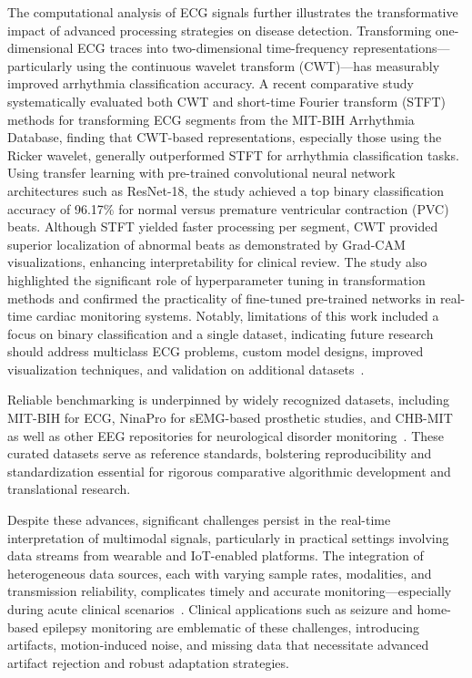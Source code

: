 \documentclass[sigconf]{acmart}
\begin{document}
The computational analysis of ECG signals further illustrates the transformative impact of advanced processing strategies on disease detection. Transforming one-dimensional ECG traces into two-dimensional time-frequency representations—particularly using the continuous wavelet transform (CWT)—has measurably improved arrhythmia classification accuracy. A recent comparative study systematically evaluated both CWT and short-time Fourier transform (STFT) methods for transforming ECG segments from the MIT-BIH Arrhythmia Database, finding that CWT-based representations, especially those using the Ricker wavelet, generally outperformed STFT for arrhythmia classification tasks. Using transfer learning with pre-trained convolutional neural network architectures such as ResNet-18, the study achieved a top binary classification accuracy of 96.17\% for normal versus premature ventricular contraction (PVC) beats. Although STFT yielded faster processing per segment, CWT provided superior localization of abnormal beats as demonstrated by Grad-CAM visualizations, enhancing interpretability for clinical review. The study also highlighted the significant role of hyperparameter tuning in transformation methods and confirmed the practicality of fine-tuned pre-trained networks in real-time cardiac monitoring systems. Notably, limitations of this work included a focus on binary classification and a single dataset, indicating future research should address multiclass ECG problems, custom model designs, improved visualization techniques, and validation on additional datasets~\cite{ref101}.

Reliable benchmarking is underpinned by widely recognized datasets, including MIT-BIH for ECG, NinaPro for sEMG-based prosthetic studies, and CHB-MIT as well as other EEG repositories for neurological disorder monitoring~\cite{ref96,ref97,ref101}. These curated datasets serve as reference standards, bolstering reproducibility and standardization essential for rigorous comparative algorithmic development and translational research.

Despite these advances, significant challenges persist in the real-time interpretation of multimodal signals, particularly in practical settings involving data streams from wearable and IoT-enabled platforms. The integration of heterogeneous data sources, each with varying sample rates, modalities, and transmission reliability, complicates timely and accurate monitoring—especially during acute clinical scenarios~\cite{ref98,ref102,ref106,ref107}. Clinical applications such as seizure and home-based epilepsy monitoring are emblematic of these challenges, introducing artifacts, motion-induced noise, and missing data that necessitate advanced artifact rejection and robust adaptation strategies.
\end{document}
